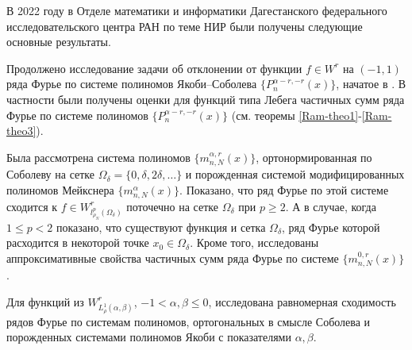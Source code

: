 ﻿\Conclusion

В 2022 году в Отделе математики и информатики Дагестанского федерального иссле\-довательского центра РАН по теме НИР были получены следующие основные результаты.





Продолжено исследование задачи об отклонении от функции $f\in W^r$ на $(-1,1)$ ряда Фурье по системе полиномов Якоби--Соболева $\{P_n^{\alpha-r,-r}(x)\}$, начатое в \cite{mmg-Shii-matzam2017}. В частности были получены оценки для функций типа Лебега частичных сумм ряда Фурье по системе полиномов $\{P_n^{\alpha-r,-r}(x)\}$ (см. теоремы \ref{Ram-theo1}-\ref{Ram-theo3}).

Была рассмотрена система полиномов $\{m_{n,N}^{\alpha,r}(x)\}$, ортонормированная по Соболеву на сетке $\Omega_\delta=\{0, \delta, 2\delta, \ldots\}$ и порожденная системой модифицированных полиномов Мейкснера $\{m_{n,N}^{\alpha}(x)\}$. Показано, что ряд Фурье по этой системе сходится к $f\in W^r_{l^p_{\rho_N}(\Omega_\delta)}$ поточечно на сетке $\Omega_\delta$ при $p\ge2$. А в случае, когда $1\le p<2$ показано, что существуют функция и сетка $\Omega_\delta$, ряд Фурье которой расходится в некоторой точке $x_0\in\Omega_\delta$. Кроме того, исследованы аппроксимативные свойства частичных сумм ряда Фурье по системе $\{m_{n,N}^{0,r}(x)\}$.


Для функций из $W^r_{L^1_\rho(\alpha,\beta)}$, $-1 <\alpha, \beta  \le 0$, исследована равномерная сходимость рядов Фурье по системам полиномов, ортогональных в смысле Соболева и порожденных системами полиномов Якоби с показателями $\alpha, \beta$.

